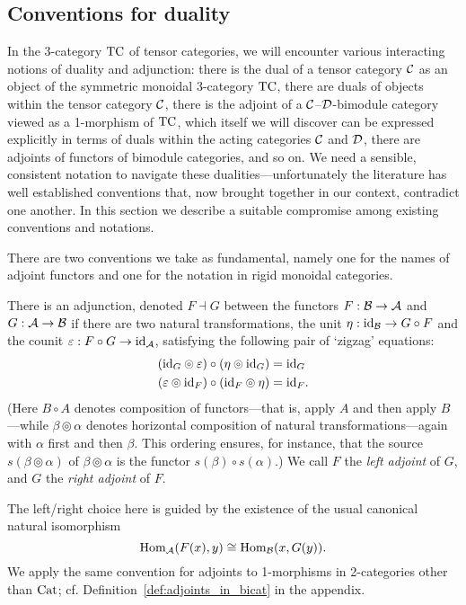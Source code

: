\documentclass{amsart}
\begin{document}
\subsection{Conventions for duality} \label{sec:conventions}


In the 3-category $\mathrm{TC}$ of tensor categories, we will encounter various interacting notions of duality and adjunction: there is the dual of a tensor category $\mathcal C$ as an object of the symmetric monoidal 3-category $\mathrm{TC}$, there are duals of objects within the tensor category $\mathcal C$, there is the adjoint of a $\mathcal C$--$\mathcal D$-bimodule category viewed as a 1-morphism of $\mathrm{TC}$, which itself we will discover can be expressed explicitly in terms of duals within the acting categories $\mathcal C$ and $\mathcal D$, there are adjoints of functors of bimodule categories, and so on.  We need a sensible, consistent notation to navigate these dualities---unfortunately the literature has well established conventions that, now brought together in our context, contradict one another.  In this section we describe a suitable compromise among existing conventions and notations.

There are two conventions we take as fundamental, namely one for the names of adjoint functors and one for the notation in rigid monoidal categories.

\begin{definition} \label{def:Adjoints}
There is an adjunction, denoted $F \dashv G$ between the functors $F: \mathcal B \to \mathcal A$ and $G : \mathcal A \to \mathcal B$ if there are two natural transformations, the unit $\eta: \mathrm{id}_{\mathcal B} \to G \circ F$ and the counit $\varepsilon: F \circ G \to \mathrm{id}_{\mathcal A}$, satisfying the following pair of `zigzag' equations:
	\begin{align*}
		(\mathrm{id}_{G} \circledcirc \varepsilon  ) \circ (  \eta \circledcirc \mathrm{id}_{G}) &= \mathrm{id}_{G} \\
		(\varepsilon \circledcirc \mathrm{id}_{F}) \circ (\mathrm{id}_{F} \circledcirc \eta) &= \mathrm{id}_{F}.
	\end{align*}
(Here $B \circ A$ denotes composition of functors---that is, apply $A$ and then apply $B$---while $\beta \circledcirc \alpha$ denotes horizontal composition of natural transformations---again with $\alpha$ first and then $\beta$.  This ordering ensures, for instance, that the source $s(\beta \circledcirc \alpha)$ of $\beta \circledcirc \alpha$ is the functor $s(\beta) \circ s(\alpha)$.)  We call $F$ the \emph{left adjoint} of $G$, and $G$ the \emph{right adjoint} of $F$.
\end{definition}
\nid The left/right choice here is guided by the existence of the usual canonical natural isomorphism
\begin{equation*}
	\operatorname{Hom}_\mathcal A(F(x), y) \cong \operatorname{Hom}_\mathcal B(x, G(y)).
\end{equation*}
We apply the same convention for adjoints to 1-morphisms in 2-categories other than $\mathrm{Cat}$; cf. Definition~\ref{def:adjoints_in_bicat} in the appendix.
\end{document}
